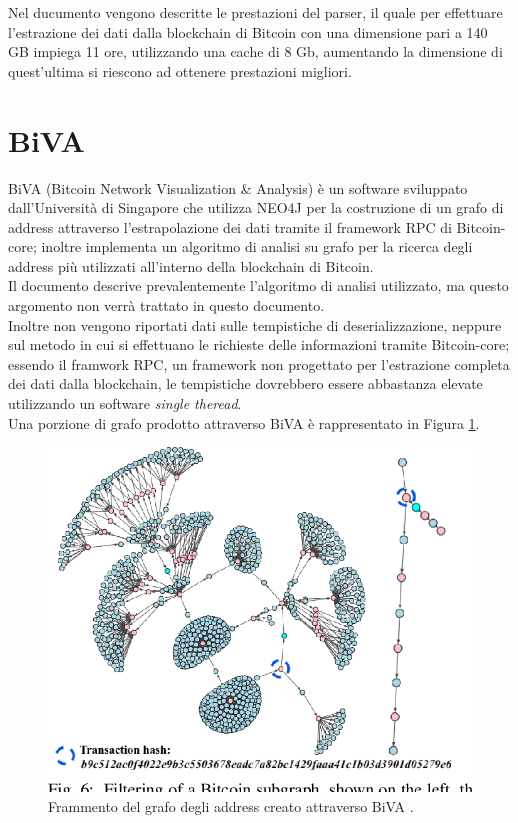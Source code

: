 Nel ducumento \cite{blocksci:article} vengono descritte le prestazioni del parser, il quale per effettuare l'estrazione dei dati dalla blockchain di Bitcoin con una dimensione pari a 140 GB impiega 11 ore, utilizzando una cache di 8 Gb, aumentando la dimensione di quest'ultima si riescono ad ottenere prestazioni migliori.

\section{BiVA} \label{sec:biva}

BiVA (Bitcoin Network Visualization \& Analysis) è un software sviluppato dall'Università di Singapore che utilizza NEO4J per la costruzione di un grafo di address attraverso l'estrapolazione dei dati tramite il framework RPC di Bitcoin-core; inoltre implementa un algoritmo di analisi su grafo per la ricerca degli address più utilizzati all'interno della blockchain di Bitcoin.\\
Il documento \cite{biva:article} descrive prevalentemente l'algoritmo di analisi utilizzato, ma questo argomento non verrà trattato in questo documento.\\
Inoltre non vengono riportati dati sulle tempistiche di deserializzazione, neppure sul metodo in cui si effettuano le richieste delle informazioni tramite Bitcoin-core; essendo il framwork RPC, un framework non progettato per l'estrazione completa dei dati dalla blockchain, le tempistiche dovrebbero essere abbastanza elevate utilizzando un software \emph{single theread}.\\
Una porzione di grafo prodotto attraverso BiVA è rappresentato in Figura \ref{fig:bivaGraph}.

\begin{figure}
\centering
\includegraphics[scale=0.35]{images/bivaGraph.png}
\caption{Frammento del grafo degli address creato attraverso BiVA \cite{biva:article}.\label{fig:bivaGraph}}
\end{figure}


